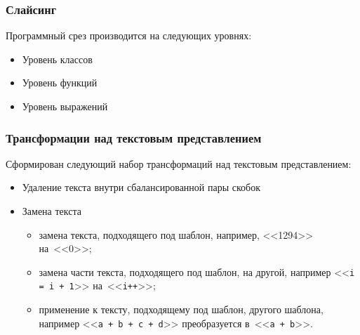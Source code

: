 
\begin{frame}
	\frametitle{Слайсинг}
		Программный срез производится на следующих уровнях:
		\begin{itemize}
			\item Уровень классов
			\item Уровень функций
			\item Уровень выражений
		\end{itemize}
\end{frame}


\begin{frame}
	\frametitle{Трансформации над текстовым представлением}
		Сформирован следующий набор трансформаций над текстовым представлением:
		\begin{itemize}
			\item Удаление текста внутри сбалансированной пары скобок
			\item Замена текста
			\begin{itemize}
				\item замена текста, подходящего под шаблон, например, <<1294>> на~<<0>>; 
				\item замена части текста, подходящего под шаблон, на другой, например <<\texttt{i = i + 1}>> на~<<\texttt{i++}>>;
				\item применение к тексту, подходящему под шаблон, другого шаблона, например <<\texttt{a + b + c + d}>> преобразуется в~<<\texttt{a + b}>>.
\end{itemize}
		\end{itemize}
\end{frame}


